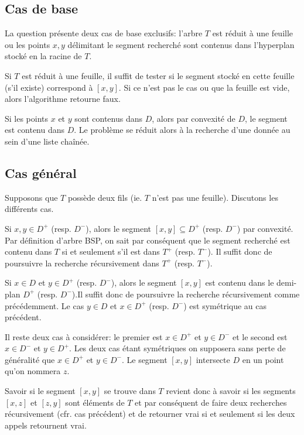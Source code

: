 
\subsection{Cas de base}
La question présente deux cas de base exclusifs: l'arbre $T$ est
réduit à une feuille ou les points $x, y$ délimitant le segment
recherché sont contenus dans l'hyperplan stocké en la racine de $T$.

Si $T$ est réduit à une feuille, il suffit de tester si le segment
stocké en cette feuille (s'il existe) correspond à $[x, y]$. Si ce
n'est pas le cas ou que la feuille est vide, alors l'algorithme
retourne faux.

Si les points $x$ et $y$ sont contenus dans $D$, alors par convexité
de $D$, le segment est contenu dans $D$. Le problème se réduit alors
à la recherche d'une donnée au sein d'une liste chaînée.

\subsection{Cas général}
Supposons que $T$ possède deux fils (ie. $T$ n'est pas une feuille).
Discutons les différents cas.

Si $x,y \in D^+$ (resp. $D^-$), alors le segment $[x,y] \subseteq D^+$
(resp. $D^-$) par convexité. Par définition d'arbre BSP,
on sait par conséquent que le segment recherché est contenu dans $T$
si et seulement s'il est dans $T^+$ (resp. $T^-$). Il suffit donc de
poursuivre la recherche récursivement dans $T^+ $ (resp. $T^-$).

Si $x \in D $ et $y \in D^+$ (resp. $D^-$), alors le segment $[x, y]$ est
contenu dans le demi-plan $D^+$ (resp. $D^-$).Il suffit donc de poursuivre la
recherche récursivement comme précédemment. Le cas $y \in D $ et $x \in D^+$
(resp. $D^-$) est symétrique au cas précédent.

Il reste deux cas à considérer: le premier est $ x \in D^+$ et $ y \in D^-$ et
le second est $x \in D^-$ et $ y \in D^+$. Les deux cas étant symétriques on
supposera sans perte de généralité que $ x \in D^+$ et $ y \in D^-$.
Le segment $[x,y]$ intersecte $D$ en un point qu'on nommera $z$.

Savoir si le segment $[x,y]$ se trouve dans $T$ revient donc à savoir si
les segments $[x,z]$ et $[z,y]$ sont éléments de $T$ et par conséquent de faire
deux recherches récursivement (cfr. cas précédent) et de retourner vrai si et
seulement si les deux appels retournent vrai.

